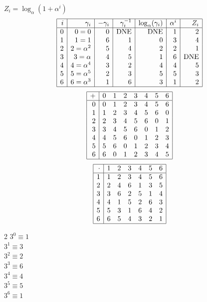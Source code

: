 $Z_i = \log_\alpha (1 + \alpha^i)$\\
$$\begin{array}{|*{7}{r|}}
\hline
i & \gamma_i & -\gamma_i& \gamma_i^{-1}& \log_\alpha(\gamma_i)& \alpha^i& Z_i\\
\hline
  0 & 0 = 0 &0 & \mbox{DNE} & \mbox{DNE} &1 &2\\
  1 &   1 = 1 &6 &1 &0 &3 &4\\
  2 &   2 = \alpha^{2} &5 &4 &2 &2 &1\\
  3 &   3 = \alpha  &4 &5 &1 &6 & \mbox{DNE}\\
  4 &   4 = \alpha^{4} &3 &2 &4 &4 &5\\
  5 &   5 = \alpha^{5} &2 &3 &5 &5 &3\\
  6 &   6 = \alpha^{3} &1 &6 &3 &1 &2\\
\hline
\end{array}
$$
$$
\begin{array}{|r|*{7}{r}|}
\hline
+  &         0 &         1 &         2 &         3 &         4 &         5 &         6\\
\hline
         0&         0&         1&         2&         3&         4&         5&         6\\
         1&         1&         2&         3&         4&         5&         6&         0\\
         2&         2&         3&         4&         5&         6&         0&         1\\
         3&         3&         4&         5&         6&         0&         1&         2\\
         4&         4&         5&         6&         0&         1&         2&         3\\
         5&         5&         6&         0&         1&         2&         3&         4\\
         6&         6&         0&         1&         2&         3&         4&         5\\
\hline
\end{array}
$$
$$
\begin{array}{|r|*{6}{r}|}
\hline
\cdot  &         1 &         2 &         3 &         4 &         5 &         6\\
\hline
         1&         1&         2&         3&         4&         5&         6\\
         2&         2&         4&         6&         1&         3&         5\\
         3&         3&         6&         2&         5&         1&         4\\
         4&         4&         1&         5&         2&         6&         3\\
         5&         5&         3&         1&         6&         4&         2\\
         6&         6&         5&         4&         3&         2&         1\\
\hline
\end{array}
$$
\begin{multicols}{2}
\noindent
$3^{0} \equiv 1$\\
$3^{1} \equiv 3$\\
$3^{2} \equiv 2$\\
$3^{3} \equiv 6$\\
$3^{4} \equiv 4$\\
$3^{5} \equiv 5$\\
$3^{6} \equiv 1$\\
\end{multicols}
